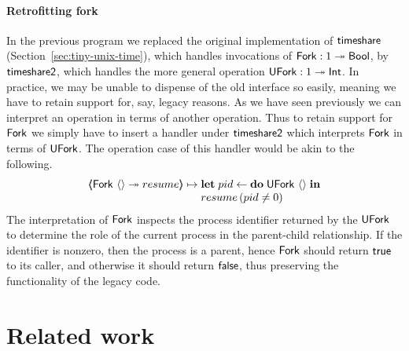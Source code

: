 \documentclass[12pt,phd,lfcs,twoside,openright,logo,leftchapter,normalheadings]{infthesis}
\theoremstyle{plain}
\theoremstyle{definition}
\begin{document}
\paragraph{Retrofitting fork} In the previous program we replaced the
original implementation of $\mathsf{timeshare}$
(Section~\ref{sec:tiny-unix-time}), which handles invocations of
$\mathsf{Fork} : 1 \twoheadrightarrow \mathsf{Bool}$, by $\mathsf{timeshare2}$, which handles the
more general operation $\mathsf{UFork} : 1 \twoheadrightarrow \mathsf{Int}$. In practice,
we may be unable to dispense of the old interface so easily, meaning
we have to retain support for, say, legacy reasons. As we have seen
previously we can interpret an operation in terms of another
operation. Thus to retain support for $\mathsf{Fork}$ we simply have to insert
a handler under $\mathsf{timeshare2}$ which interprets $\mathsf{Fork}$ in terms of
$\mathsf{UFork}$. The operation case of this handler would be akin to the
following.
%
\[
  \OpCase{\Fork}{\Unit}{resume} \mapsto
    \bl
      \Let\;pid \revto \Do\;\UFork~\Unit\;\In\\
      resume\,(pid \neq 0)
    \el
\]
%
The interpretation of $\mathsf{Fork}$ inspects the process identifier returned
by the $\mathsf{UFork}$ to determine the role of the current process in the
parent-child relationship. If the identifier is nonzero, then the
process is a parent, hence $\mathsf{Fork}$ should return $\mathsf{true}$ to its
caller, and otherwise it should return $\mathsf{false}$, thus preserving the
functionality of the legacy code.

\section{Related work}
\label{sec:unix-related-work}
\end{document}
